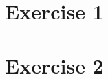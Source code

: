 \documentclass{scrartcl}
\begin{document}
\section*{Exercise 1}



\pagebreak

\section*{Exercise 2}


\end{document}
